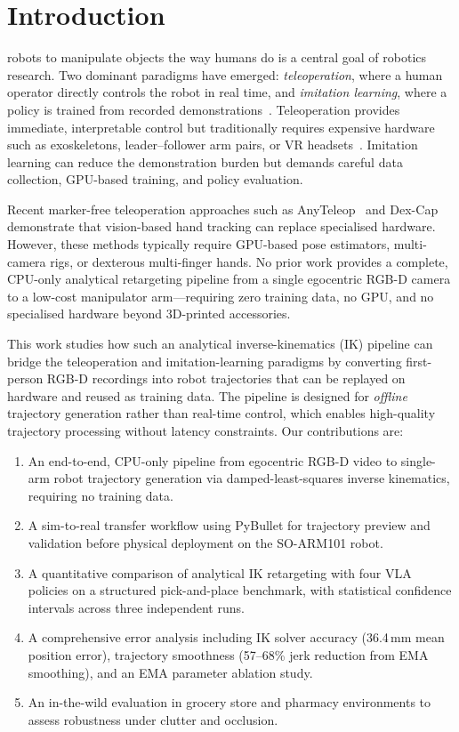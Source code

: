 \documentclass{ieeeaccess}
\begin{document}
\section{Introduction}
\label{sec:introduction}
 robots to manipulate objects the way humans do is a
central goal of robotics research. Two dominant paradigms have emerged:
\emph{teleoperation}, where a human operator directly controls the robot
in real time, and \emph{imitation learning}, where a policy is trained
from recorded demonstrations~\cite{zhao2023act,cadena2025smolvla}.
Teleoperation provides immediate, interpretable control but traditionally
requires expensive hardware such as exoskeletons, leader--follower arm
pairs, or VR headsets~\cite{cheng2025opentv,ding2024bunny}. Imitation
learning can reduce the demonstration burden but demands careful data
collection, GPU-based training, and policy evaluation.

Recent marker-free teleoperation approaches such as
AnyTeleop~\cite{qin2023anyteleop} and
Dex-Cap~\cite{wang2024dexcap} demonstrate that vision-based hand
tracking can replace specialised hardware. However, these methods
typically require GPU-based pose estimators, multi-camera rigs, or
dexterous multi-finger hands. No prior work provides a complete,
CPU-only analytical retargeting pipeline from a single egocentric RGB-D
camera to a low-cost manipulator arm---requiring zero training data,
no GPU, and no specialised hardware beyond 3D-printed accessories.

This work studies how such an analytical inverse-kinematics (IK)
pipeline can bridge the teleoperation and imitation-learning paradigms
by converting first-person RGB-D recordings into robot trajectories
that can be replayed on hardware and reused as training data.
The pipeline is designed for \emph{offline} trajectory generation
rather than real-time control, which enables high-quality trajectory
processing without latency constraints.
Our contributions are:

\begin{enumerate}
  \item An end-to-end, CPU-only pipeline from egocentric RGB-D video
        to single-arm robot trajectory generation via damped-least-squares
        inverse kinematics, requiring no training data.
  \item A sim-to-real transfer workflow using PyBullet for trajectory
        preview and validation before physical deployment on the
        SO-ARM101 robot.
  \item A quantitative comparison of analytical IK retargeting with
        four VLA policies on a structured pick-and-place benchmark,
        with statistical confidence intervals across three independent
        runs.
  \item A comprehensive error analysis including IK solver accuracy
        (36.4\,mm mean position error), trajectory smoothness (57--68\%
        jerk reduction from EMA smoothing), and an EMA parameter
        ablation study.
  \item An in-the-wild evaluation in grocery store and pharmacy
        environments to assess robustness under clutter and occlusion.
\end{enumerate}
\end{document}
